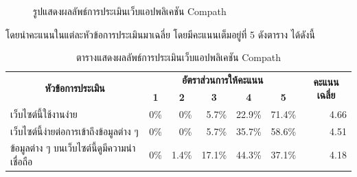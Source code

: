 \begin{enumerate}
\begin{figure}[H]
              \caption{รูปแสดงผลลัพธ์การประเมินเว็บแอปพลิเคชัน Compath}\label{fig:QuantitativeResult}
          \end{figure}
          โดยนำคะแนนในแต่ละหัวข้อการประเมินมาเฉลี่ย โดยมีคะแนนเต็มอยู่ที่ 5 ดังตาราง ได้ดังนี้
          \begin{table}[H]
              \caption{ตารางแสดงผลลัพธ์การประเมินเว็บแอปพลิเคชัน Compath}
              \label{tab:QuantitativeResult}
              \begin{tabular}{|l|rrrrr|r|}
                  \hline
                  \multicolumn{1}{|c|}{\multirow{2}{*}{\textbf{หัวข้อการประเมิน}}}                                              & \multicolumn{5}{c|}{\textbf{อัตราส่วนการให้คะแนน}} & \multicolumn{1}{c|}{\multirow{2}{*}{\textbf{คะแนนเฉลี่ย}}}                                                                                                                               \\ \cline{2-6}
                  \multicolumn{1}{|c|}{}                                                                                     & \multicolumn{1}{c|}{\textbf{1}}                 & \multicolumn{1}{c|}{\textbf{2}}                          & \multicolumn{1}{c|}{\textbf{3}} & \multicolumn{1}{c|}{\textbf{4}} & \multicolumn{1}{c|}{\textbf{5}} & \multicolumn{1}{c|}{} \\ \hline
                  เว็บไซต์นี้ใช้งานง่าย                                                                                            & \multicolumn{1}{r|}{0\%}                        & \multicolumn{1}{r|}{0\%}                                 & \multicolumn{1}{r|}{5.7\%}      & \multicolumn{1}{r|}{22.9\%}     & 71.4\%                          & 4.66                  \\ \hline
                  เว็บไซต์นี้ง่ายต่อการเข้าถึงข้อมูลต่าง ๆ                                                                              & \multicolumn{1}{r|}{0\%}                        & \multicolumn{1}{r|}{0\%}                                 & \multicolumn{1}{r|}{5.7\%}      & \multicolumn{1}{r|}{35.7\%}     & 58.6\%                          & 4.51                  \\ \hline
                  ข้อมูลต่าง ๆ บนเว็บไซต์นี้ดูมีความน่าเชื่อถือ                                                                           & \multicolumn{1}{r|}{0\%}                        & \multicolumn{1}{r|}{1.4\%}                               & \multicolumn{1}{r|}{17.1\%}     & \multicolumn{1}{r|}{44.3\%}     & 37.1\%                          & 4.18                  \\ \hline

\end{tabular}
\end{table}
\end{enumerate}
